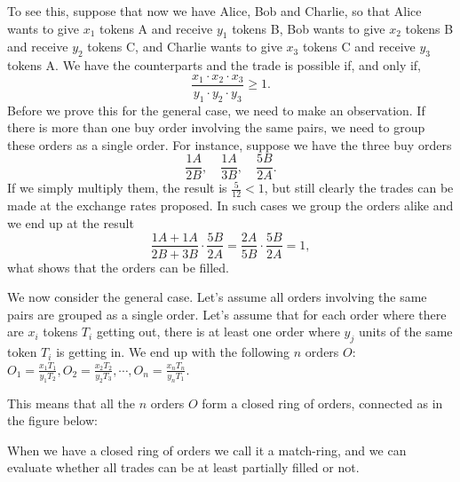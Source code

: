 \documentclass{article}
\theoremstyle{remark}
\theoremstyle{definition}
\begin{document}
To see this, suppose that now we have Alice, Bob and Charlie, so that Alice wants to give $x_1$ tokens A and receive $y_1$ tokens B, Bob wants to give $x_2$ tokens B and receive $y_2$ tokens C, and Charlie wants to give $x_3$ tokens C and receive $y_3$ tokens A. We have the counterparts and the trade is possible if, and only if,
$$
\frac{x_1\cdot x_2\cdot x_3}{y_1\cdot y_2\cdot y_3}\geq1.
$$
%
Before we prove this for the general case, we need to make an observation. If there is more than one buy order involving the same pairs, we need to group these orders as a single order. For instance, suppose we have the three buy orders
$$
\frac{1A}{2B},\quad\frac{1A}{3B},\quad\frac{5B}{2A}.
$$
%
If we simply multiply them, the result is $\frac{5}{12}<1$, but still clearly the trades can be made at the exchange rates proposed. In such cases we group the orders alike and we end up at the result
$$
\frac{1A+1A}{2B+3B}\cdot\frac{5B}{2A}=\frac{2A}{5B}\cdot\frac{5B}{2A}=1,
$$
what shows that the orders can be filled.

We now consider the general case. Let's assume all orders involving the same pairs are grouped as a single order. Let's assume that for each order where there are $x_i$ tokens $T_i$ getting out, there is at least one order where $y_j$ units of the same token $T_i$ is getting in. We end up with the following $n$ orders $O$: $O_1=\frac{x_1T_1}{y_1T_2}, O_2=\frac{x_2T_2}{y_2T_3},\cdots, O_n=\frac{x_nT_n}{y_nT_1}$.

This means that all the $n$ orders $O$ form a closed ring of orders, connected as in the figure below:

\begin{center} 
\end{center}
%
When we have a closed ring of orders we call it a match-ring, and we can evaluate whether all trades can be at least partially filled or not.
\end{document}
